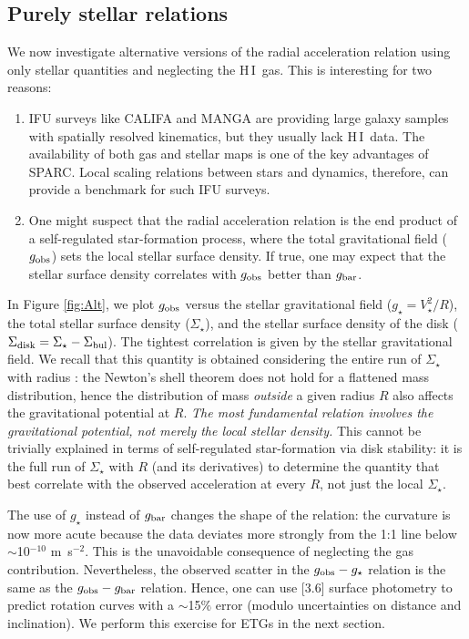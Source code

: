 \documentclass[apjl, twocolappendix]{emulateapj}
\newcommand{\hi } {{\rm H}\,{\small\rm I} \,}
\begin{document}
\subsection{Purely stellar relations}\label{sec:Stellar}

We now investigate alternative versions of the radial acceleration relation using only stellar quantities and neglecting the \hi gas. This is interesting for two reasons:
\begin{enumerate}
\item IFU surveys like CALIFA \citep{GarciaLorenzo2015} and MANGA \citep{Bundy2015} are providing large galaxy samples with spatially resolved kinematics, but they usually lack \hi data. The availability of both gas and stellar maps is one of the key advantages of SPARC. Local scaling relations between stars and dynamics, therefore, can provide a benchmark for such IFU surveys.
\item One might suspect that the radial acceleration relation is the end product of a self-regulated star-formation process, where the total gravitational field ($g_{\rm obs}$) sets the local stellar surface density. If true, one may expect that the stellar surface density correlates with $g_{\rm obs}$ better than $g_{\rm bar}$.
\end{enumerate}

In Figure \ref{fig:Alt}, we plot $g_{\rm obs}$ versus the stellar gravitational field ($g_{\star} = V_{\star}^2/R$), the total stellar surface density ($\Sigma_{\star}$), and the stellar surface density of the disk ($\Sigma_{\rm disk} = \Sigma_{\star} - \Sigma_{\rm bul}$). The tightest correlation is given by the stellar gravitational field. We recall that this quantity is obtained considering the entire run of $\Sigma_{\star}$ with radius \citep{Casertano1983}: the Newton's shell theorem does not hold for a flattened mass distribution, hence the distribution of mass \textit{outside} a given radius $R$ also affects the gravitational potential at $R$. \textit{The most fundamental relation involves the gravitational potential, not merely the local stellar density.} This cannot be trivially explained in terms of self-regulated star-formation via disk stability: it is the full run of $\Sigma_{\star}$ with $R$ (and its derivatives) to determine the quantity that best correlate with the observed acceleration at every $R$, not just the local $\Sigma_{\star}$.

The use of $g_{\star}$ instead of $g_{\rm bar}$ changes the shape of the relation: the curvature is now more acute because the data deviates more strongly from the 1:1 line below $\sim$10$^{-10}$ m~s$^{-2}$. This is the unavoidable consequence of neglecting the gas contribution. Nevertheless, the observed scatter in the $g_{\rm obs}-g_{\star}$ relation is the same as the $g_{\rm obs}-g_{\rm bar}$ relation. Hence, one can use [3.6] surface photometry to predict rotation curves with a $\sim$15$\%$ error (modulo uncertainties on distance and inclination). We perform this exercise for ETGs in the next section.
\end{document}

